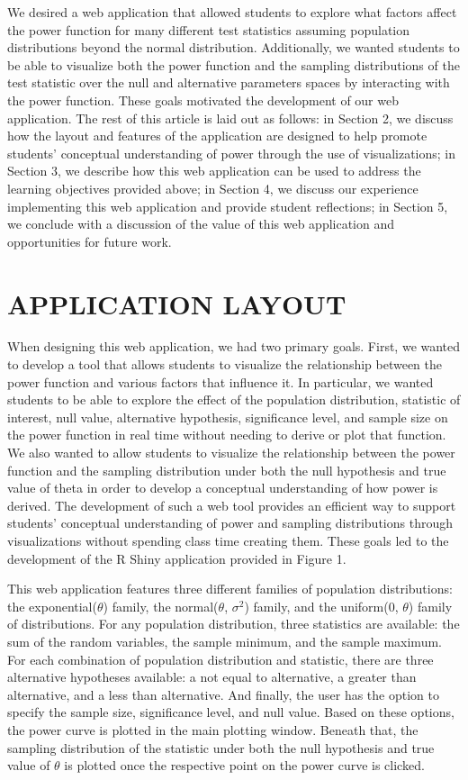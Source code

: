 \documentclass{TISE}
\begin{document}
We desired a web application that allowed students to explore what factors affect the power function for many different test statistics assuming population distributions beyond the normal distribution. Additionally, we wanted students to be able to visualize both the power function and the sampling distributions of the test statistic over the null and alternative parameters spaces by interacting with the power function. These goals motivated the development of our web application. The rest of this article is laid out as follows: in Section 2, we discuss how the layout and features of the application are designed to help promote students' conceptual understanding of power through the use of visualizations; in Section 3, we describe how this web application can be used to address the learning objectives provided above; in Section 4, we discuss our experience implementing this web application and provide student reflections; in Section 5, we conclude with a discussion of the value of this web application and opportunities for future work. 

\section{APPLICATION LAYOUT}

When designing this web application, we had two primary goals. First, we wanted to develop a tool that allows students to visualize the relationship between the power function and various factors that influence it. In particular, we wanted students to be able to explore the effect of the population distribution, statistic of interest, null value, alternative hypothesis, significance level, and sample size on the power function in real time without needing to derive or plot that function. We also wanted to allow students to visualize the relationship between the power function and the sampling distribution under both the null hypothesis and true value of theta in order to develop a conceptual understanding of how power is derived. The development of such a web tool provides an efficient way to support students' conceptual understanding of power and sampling distributions through visualizations without spending class time creating them. These goals led to the development of the {\sf R} Shiny application provided in Figure 1. 

This web application features three different families of population distributions: the exponential($\theta$) family, the normal($\theta$, $\sigma^2$) family, and the uniform(0, $\theta$) family of distributions. For any population distribution, three statistics are available: the sum of the random variables, the sample minimum, and the sample maximum. For each combination of population distribution and statistic, there are three alternative hypotheses available: a not equal to alternative, a greater than alternative, and a less than alternative. And finally, the user has the option to specify the sample size, significance level, and null value. Based on these options, the power curve is plotted in the main plotting window. Beneath that, the sampling distribution of the statistic under both the null hypothesis and true value of $\theta$ is plotted once the respective point on the power curve is clicked. 
\end{document}
